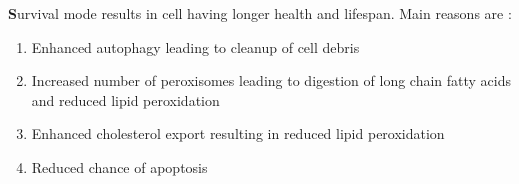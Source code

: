 \textbf Survival mode results in cell having longer health and lifespan. Main reasons are :
\begin{enumerate}
\item Enhanced autophagy leading to cleanup of cell debris
\item Increased number of peroxisomes leading to digestion of long chain fatty acids and reduced lipid peroxidation
\item Enhanced cholesterol export resulting in reduced lipid peroxidation
\item Reduced chance of apoptosis
\end{enumerate}